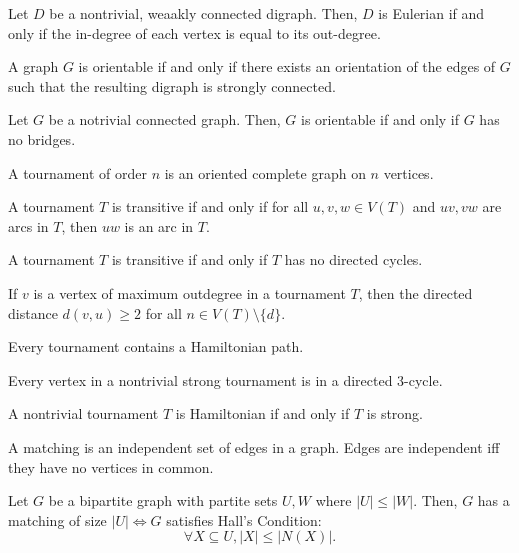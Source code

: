 \documentclass{article}
\begin{document}
\medskip{}

    Let $D$ be a nontrivial, weaakly connected digraph.
    Then, $D$ is Eulerian if and only if the in-degree of each vertex is equal to its out-degree.

\medskip{}

	A graph $G$ is orientable if and only if there exists an orientation of the edges of $G$ such that the resulting digraph is strongly connected.

\medskip{}

	Let $G$ be a notrivial connected graph.
	Then, $G$ is orientable if and only if $G$ has no bridges.

\medskip{}

	A tournament of order $n$ is an oriented complete graph on $n$ vertices.

\medskip{}

	A tournament $T$ is transitive if and only if for all $u,v,w \in V(T)$ and $uv,vw$ are arcs in $T$, then $uw$ is an arc in $T$.

\medskip{}

	A tournament $T$ is transitive if and only if $T$ has no directed cycles.

\medskip{}

	If $v$ is a vertex of maximum outdegree in a tournament $T$, then the directed distance $d(v, u) \geq 2$ for all $n \in V(T) \setminus \{d\}$.

\medskip{}

	Every tournament contains a Hamiltonian path.

\medskip{}

	Every vertex in a nontrivial strong tournament is in a directed 3-cycle.

\medskip{}

	A nontrivial tournament $T$ is Hamiltonian if and only if $T$ is strong.

\medskip{}

	A matching is an independent set of edges in a graph. Edges are independent iff they have no vertices in common.

\medskip{}

	Let $G$ be a bipartite graph with partite sets $U,W$ where $|U| \leq |W|$.
	Then, $G$ has a matching of size $|U| \iff G$ satisfies Hall's Condition: $$\forall X \subseteq U, |X| \leq |N(X)|.$$
\end{document}
